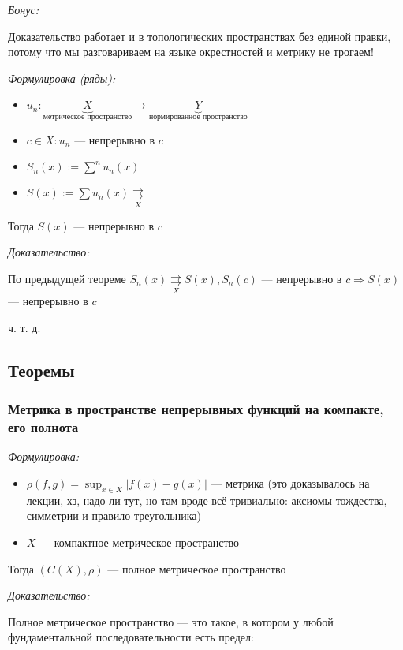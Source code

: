 \documentclass{article}
\def\rsh#1{\underset{#1}{\rightrightarrows}}
\begin{document}
\textit{Бонус:}

\Smiley 

Доказательство работает и в топологических пространствах без единой правки, потому что мы разговариваем на языке окрестностей и метрику не трогаем!

\textit{Формулировка (ряды):}

\begin{itemize}
    \item $u_n: \underbrace{X}_{\text{метрическое пространство}} \rightarrow \underbrace{Y}_{\text{нормированное пространство}}$
    \item $c \in X: u_n$ --- непрерывно в $c$ 
    \item $S_n(x) := \sum^n u_n(x)$
    \item $S(x) := \sum u_n(x) \rsh{X}$
\end{itemize}

Тогда $S(x)$ --- непрерывно в $c$

\textit{Доказательство:}

По предыдущей теореме $S_n(x) \rsh{X} S(x), S_n(c)$ --- непрерывно в $c \Rightarrow S(x)$ --- непрерывно в $c$

ч. т. д.

\newpage

\subsection{Теоремы}

\subsubsection{Метрика в пространстве непрерывных функций на компакте, его полнота}
\textit{Формулировка:}

\begin{itemize}
    \item $\rho(f, g) = \sup_{x \in X} |f(x) - g(x)|$ --- метрика (это доказывалось на лекции, хз, надо ли тут, но там вроде всё тривиально: аксиомы тождества, симметрии и правило треугольника) 
    \item $X$ --- компактное метрическое пространство
\end{itemize}

Тогда $\left(C(X), \rho \right)$ --- полное метрическое пространство

\textit{Доказательство:}

Полное метрическое пространство --- это такое, в котором у любой фундаментальной последовательности есть предел:
\end{document}
